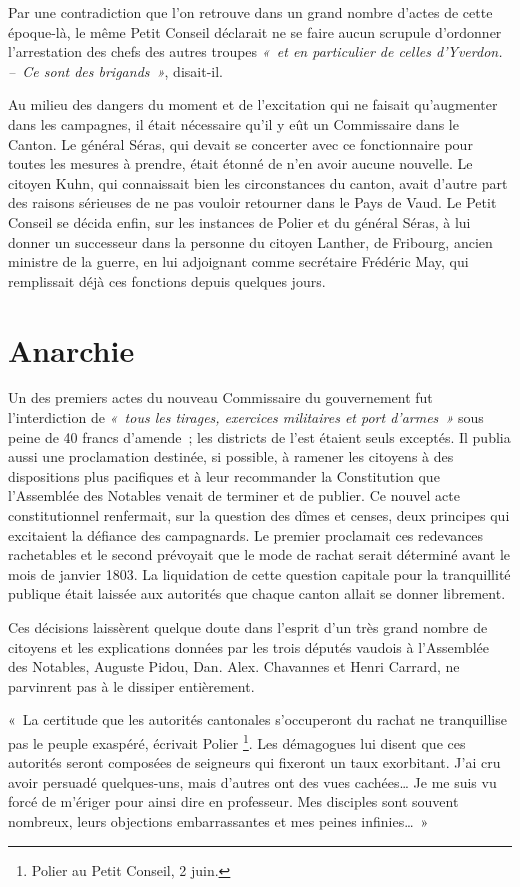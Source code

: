 \documentclass[french,twoside]{book} %
\newenvironment{quoteblock}%
  {\begin{quoting}}
  {\end{quoting}}
\newenvironment{quotebar}{%
    \def\FrameCommand{{\color{rubric!10!}\vrule width 0.5em} \hspace{0.9em}}%
    \def\OuterFrameSep{\itemsep} %
    \MakeFramed {\advance\hsize-\width \FrameRestore}
  }%
  {%
    \endMakeFramed
  }
\renewenvironment{quoteblock}%
  {%
    \savenotes
    \setstretch{0.9}
    \normalfont
    \begin{quotebar}
  }
  {%
    \end{quotebar}
    \spewnotes
  }
\begin{document}
\noindent Par une contradiction que l’on retrouve dans un grand nombre d’actes de cette époque-là, le même Petit Conseil déclarait ne se faire aucun scrupule d’ordonner l’arrestation des chefs des autres troupes \emph{« et en particulier de celles d’Yverdon. – Ce sont des brigands »}, disait-il.\par
Au milieu des dangers du moment et de l’excitation qui ne faisait qu’augmenter dans les campagnes, il était nécessaire qu’il y eût un Commissaire dans le Canton. Le général Séras, qui devait se concerter avec ce fonctionnaire pour toutes les mesures à prendre, était étonné de n’en avoir aucune nouvelle. Le citoyen Kuhn, qui connaissait bien les circonstances du canton, avait d’autre part des raisons sérieuses de ne pas vouloir retourner dans le Pays de Vaud. Le Petit Conseil se décida enfin, sur les instances de Polier et du général Séras, à lui donner un successeur dans la personne du citoyen Lanther, de Fribourg, ancien ministre de la guerre, en lui adjoignant comme secrétaire Frédéric May, qui remplissait déjà ces fonctions depuis quelques jours.
\section[Anarchie]{Anarchie}
\noindent Un des premiers actes du nouveau Commissaire du gouvernement fut l’interdiction de \emph{« tous les tirages, exercices militaires et port d’armes »} sous peine de 40 francs d’amende ; les districts de l’est étaient seuls exceptés. Il publia aussi une proclamation destinée, si possible, à ramener les citoyens à des dispositions plus pacifiques et à leur recommander la Constitution que l’Assemblée des Notables venait de terminer et de publier. Ce nouvel acte constitutionnel renfermait, sur la question des dîmes et censes, deux principes qui excitaient la défiance des campagnards. Le premier proclamait ces redevances rachetables et le second prévoyait que le mode de rachat serait déterminé avant le mois de janvier 1803. La liquidation de cette question capitale pour la tranquillité publique était laissée aux autorités que chaque canton allait se donner librement.\par
Ces décisions laissèrent quelque doute dans l’esprit d’un très grand nombre de citoyens et les explications données par les trois députés vaudois à l’Assemblée des Notables, Auguste Pidou, Dan. Alex. Chavannes et Henri Carrard, ne parvinrent pas à le dissiper entièrement.\par

\begin{quoteblock}
 \noindent  « La certitude que les autorités cantonales s’occuperont du rachat ne tranquillise pas le peuple exaspéré, écrivait Polier \footnote{Polier au Petit Conseil, 2 juin.}. Les démagogues lui disent que ces autorités seront composées de seigneurs qui fixeront un taux exorbitant. J’ai cru avoir persuadé quelques-uns, mais d’autres ont des vues cachées… Je me suis vu forcé de m’ériger pour ainsi dire en professeur. Mes disciples sont souvent nombreux, leurs objections embarrassantes et mes peines infinies… »
 \end{quoteblock}
\end{document}
